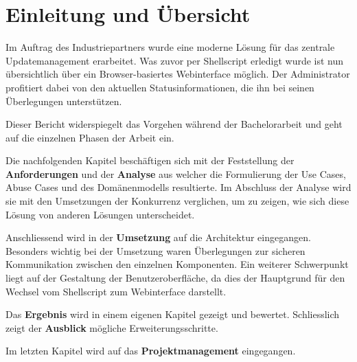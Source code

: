 \begin{comment}
Einführung in die Problem- und Aufgabenstellung. Übersicht über die übrigen Teile der Abgabe.

Diese Einleitung soll für den Ingenieur irgendeiner Fachrichtung verständlich sein. Sie stellt die Aufgabe in einen grösseren Zusammenhang und liefert eine genaue Beschreibung der Problemstellung. Allfällige Vorarbeiten oder ähnlich gelagerte Arbeiten werden diskutiert.
\end{comment}

\chapter{Einleitung und Übersicht}
\xxx[]

Im Auftrag des Industriepartners wurde eine moderne Lösung für das zentrale Updatemanagement erarbeitet. Was zuvor per Shellscript erledigt wurde ist nun übersichtlich über ein Browser-basiertes Webinterface möglich. Der Administrator profitiert dabei von den aktuellen Statusinformationen, die ihn bei seinen Überlegungen unterstützen.

Dieser Bericht widerspiegelt das Vorgehen während der Bachelorarbeit und geht auf die einzelnen Phasen der Arbeit ein.

Die nachfolgenden Kapitel beschäftigen sich mit der Feststellung der \textbf{Anforderungen} und der \textbf{Ana\-ly\-se} aus welcher die Formulierung der Use Cases, Abuse Cases und des Domänenmodells resultierte. Im Abschluss der Analyse wird sie mit den Umsetzungen der Konkurrenz verglichen, um zu zeigen, wie sich diese Lösung von anderen Lösungen unterscheidet.

Anschliessend wird in der \textbf{Umsetzung} auf die Architektur eingegangen. Besonders wichtig bei der Umsetzung waren Überlegungen zur sicheren Kommunikation zwischen den einzelnen Komponenten. Ein weiterer Schwerpunkt liegt auf der Gestaltung der Benutzeroberfläche, da dies der Hauptgrund für den Wechsel vom Shellscript zum Webinterface darstellt.

Das \textbf{Ergebnis} wird in einem eigenen Kapitel gezeigt und bewertet. Schliesslich zeigt der \textbf{Ausblick} mögliche Erweiterungsschritte.

Im letzten Kapitel wird auf das \textbf{Projektmanagement} eingegangen.
